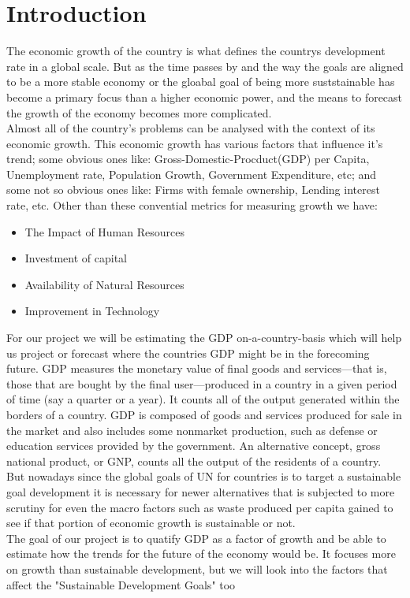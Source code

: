 \documentclass[conference]{IEEEtran}
\begin{document}
\section{Introduction}
The economic growth of the country is what defines the countrys development rate in a global scale.
But as the time passes by and the way the goals are aligned to be a more stable economy or the gloabal goal of being more suststainable has become a primary focus than a higher economic power,
and the means to forecast the growth of the economy becomes more complicated.\\
Almost all of the country's problems can be analysed with the context of its economic growth.
This economic growth has various factors that influence it's trend; some obvious ones like: Gross-Domestic-Procduct(GDP) per Capita, Unemployment rate, Population Growth, Government Expenditure, etc; and some not so obvious ones like: Firms with female ownership, Lending interest rate, etc.
Other than these convential metrics for measuring growth we have:\\
\begin{itemize}
    \item The Impact of Human Resources
    \item Investment of capital
    \item Availability of Natural Resources
    \item Improvement in Technology
\end{itemize}
\bigskip
For our project we will be estimating the GDP on-a-country-basis which will help us project or forecast where the countries GDP might be in the forecoming future.
GDP measures the monetary value of final goods and services—that is, those that are bought by the final user—produced in a country in a given period of time (say a quarter or a year).
It counts all of the output generated within the borders of a country.
GDP is composed of goods and services produced for sale in the market and also includes some nonmarket production, such as defense or education services provided by the government.
An alternative concept, gross national product, or GNP, counts all the output of the residents of a country.
\\
But nowadays since the global goals of UN for countries is to target a sustainable goal development it is necessary for newer alternatives that is subjected to more scrutiny for even the macro factors such as waste produced per capita gained to see if that portion of economic growth is sustainable or not.
\\The goal of our project is to quatify GDP as a factor of growth and be able to estimate how the trends for the future of the economy would be. It focuses more on growth than sustainable development, but we will look into the factors that affect the "Sustainable Development Goals" too
\bigskip
\end{document}
